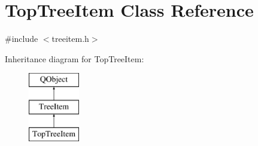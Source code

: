 \hypertarget{class_top_tree_item}{\section{Top\-Tree\-Item Class Reference}
\label{class_top_tree_item}
}


{\ttfamily \#include $<$treeitem.\-h$>$}

Inheritance diagram for Top\-Tree\-Item\-:\begin{figure}[H]
\begin{center}
\leavevmode
\includegraphics[height=3.000000cm]{class_top_tree_item}
\end{center}
\end{figure}

